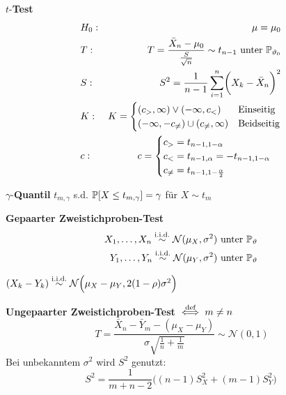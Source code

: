  $t$-\textbf{Test}\\
\begin{align*}
    & H_0:  & \mu = \mu_0 \\
    & T:    & T=\frac{\bar{X}_n-\mu_0}{\frac{S}{\sqrt{n}}} \sim t_{n-1} \text{ unter } \P_{\vartheta_0} \\
    & S:    & S^2 = \frac{1}{n-1}\sum_{i=1}^{n}\biggl( X_k-\bar{X}_n \biggr)^2 \\
    & K:    & K=\begin{cases}
        (c_>,\infty) \lor (-\infty, c_<)        & \text{Einseitig} \\
        (-\infty, -c_{\neq}) \cup (c_{\neq},\infty) & \text{Beidseitig}
    \end{cases} \\
    & c:    & c = \begin{cases}
        c_> = t_{n-1,1-\alpha} \\
        c_< = t_{n-1,\alpha} = -t_{n-1,1-\alpha} \\
        c_{\neq} = t_{n-1,1-\frac{\alpha}{2}}
    \end{cases}
\end{align*}

 $\gamma$-\textbf{Quantil} $t_{m,\gamma}$ s.d. $\P[X \leq t_{m,\gamma}] = \gamma$ für $X \sim t_m$

\newpage

 \textbf{Gepaarter Zweistichproben-Test}\\
\begin{align*}
    X_1,\ldots,X_n \overset{\text{i.i.d.}}{\sim} \mathcal{N}(\mu_X,\sigma^2) \text{ unter } \P_{\vartheta} \\
    Y_1,\ldots,Y_n \overset{\text{i.i.d.}}{\sim} \mathcal{N}(\mu_Y,\sigma^2) \text{ unter } \P_{\vartheta}
\end{align*}

{\footnotesize
    \remark $(X_k-Y_k) \overset{\text{i.i.d.}}{\sim} \mathcal{N}\Bigl(\mu_X-\mu_Y,2(1-\rho)\sigma^2\Bigr)$\\
}

 \textbf{Ungepaarter Zweistichproben-Test} $\iffdef m \neq n$
$$\
    T=\frac{\bar{X}_n - \bar{Y}_m - (\mu_X-\mu_Y)}{\sigma\sqrt{\frac{1}{n}+\frac{1}{m}}} \sim\mathcal{N}(0,1)
$$
Bei unbekanntem $\sigma^2$ wird $S^2$ genutzt:
$$
    S^2 = \frac{1}{m+n-2}\biggl( (n-1)S_X^2+(m-1)S_Y^2 \biggr)
$$

